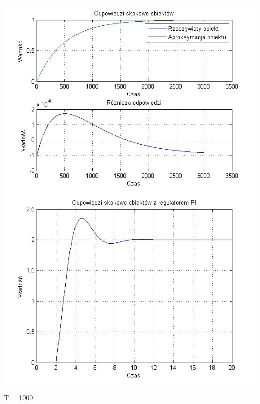 \documentclass[10pt,a4paper]{article}
\begin{document}
\begin{center}
\includegraphics[scale=1]{images/jeden/skrypt_39.png}\\
\includegraphics[scale=1]{images/jeden/skrypt_40.png}\\
\end{center}
\newpage
T = 1000
\end{document}
